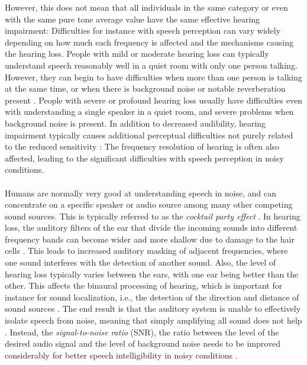 \documentclass[english, 12pt, a4paper, pdftex, elec, utf8]{aaltothesis}
\begin{document}
However, this does not mean that all individuals in the same category or even with the same pure tone average value have the same effective hearing impairment: Difficulties for instance with speech perception can vary widely depending on how much each frequency is affected and the mechanisms causing the hearing loss. People with mild or moderate hearing loss can typically understand speech reasonably well in a quiet room with only one person talking. However, they can begin to have difficulties when more than one person is talking at the same time, or when there is background noise or notable reverberation present \cite{peterson2010cochlear}. People with severe or profound hearing loss usually have difficulties even with understanding a single speaker in a quiet room, and severe problems when background noise is present. In addition to decreased audibility, hearing impairment typically causes additional perceptual difficulties not purely related to the reduced sensitivity \cite{moore2007cochlear}: The frequency resolution of hearing is often also affected, leading to the significant difficulties with speech perception in noisy conditions. \\\\
Humans are normally very good at understanding speech in noise, and can concentrate on a specific speaker or audio source among many other competing sound sources. This is typically referred to as the \textit{cocktail party effect} \cite{bronkhorst2000cocktail}. In hearing loss, the auditory filters of the ear that divide the incoming sounds into different frequency bands can become wider and more shallow due to damage to the hair cells \cite{moore2007cochlear}. This leads to increased auditory masking of adjacent frequencies, where one sound interferes with the detection of another sound. Also, the level of hearing loss typically varies between the ears, with one ear being better than the other. This affects the binaural processing of hearing, which is important for instance for sound localization, i.e., the detection of the direction and distance of sound sources \cite{moore2007cochlear, pulkki2015communication}. The end result is that the auditory system is unable to effectively isolate speech from noise, meaning that simply amplifying all sound does not help \cite[p.~233--234]{moore2007cochlear}. Instead, the \textit{signal-to-noise ratio} (SNR), the ratio between the level of the desired audio signal and the level of background noise needs to be improved considerably for better speech intelligibility in noisy conditions \cite{healy2016difficulty, fink2008benefit}.
\end{document}
